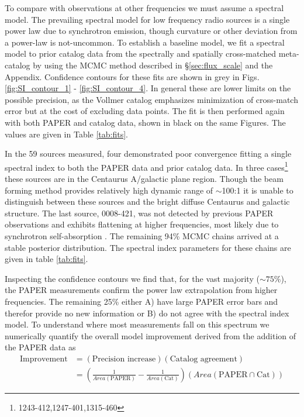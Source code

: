 \documentclass[preprint]{aastex}
\newcommand{\PAPER}{\mathrm{PAPER}}
\begin{document}
To compare with observations at other frequencies we must assume a spectral model. The prevailing spectral model for low frequency radio sources is a single power law due to synchrotron emission, though curvature or other deviation from a power-law is not-uncommon.   To establish a baseline model, we fit a spectral model to prior catalog data from the spectrally and spatially cross-matched meta-catalog by \citet{Vollmer:2010p6422} using the MCMC method described in \S \ref{sec:flux_scale} and the Appendix. Confidence contours for these fits are shown in grey in Figs. \ref{fig:SI_contour_1} - \ref{fig:SI_contour_4}.  In general these are lower limits on the possible precision, as the Vollmer catalog emphasizes minimization of cross-match error but at the cost of excluding data points.  The fit is then performed again with both PAPER and catalog data, shown in black on the same Figures. The values are given in Table \ref{tab:fits}. 

In the 59 sources measured, four demonstrated poor convergence fitting a single spectral index to both the PAPER data and prior catalog data. In three cases\footnote{1243-412,1247-401,1315-460} %
these sources are in the Centaurus A/galactic plane region. Though the beam forming method provides relatively high dynamic range of $\sim$100:1 it is unable to distinguish between these sources and the bright diffuse Centaurus and galactic structure. The last source, 0008-421, was not detected by previous PAPER observations and exhibits flattening at higher frequencies, most likely due to synchrotron self-absorption \citep{Jacobs:2011p8438} .  The remaining 94\% MCMC chains arrived at a stable posterior distribution. The spectral index parameters for these chains are given in table \ref{tab:fits}.

Inspecting the confidence contours we find that, for the vast majority ($\sim 75$\%), the PAPER measurements confirm the power law extrapolation from higher frequencies. The remaining 25\% either A) have large PAPER error bars and therefor provide no new information or B) do not agree with the spectral index model.  To understand where most measurements fall on this spectrum we numerically quantify the overall model improvement derived from the addition of the PAPER data as 
\begin{align}
\textrm{Improvement} &= \left(\textrm{Precision increase}\right) \left(\textrm{Catalog agreement}\right)\\
&= \left(\frac{1}{Area(\textrm{PAPER})} - \frac{1}{Area(\textrm{Cat})}\right) \left( Area(\PAPER \cap \textrm{Cat}) \right)
\end{align}
\end{document}
